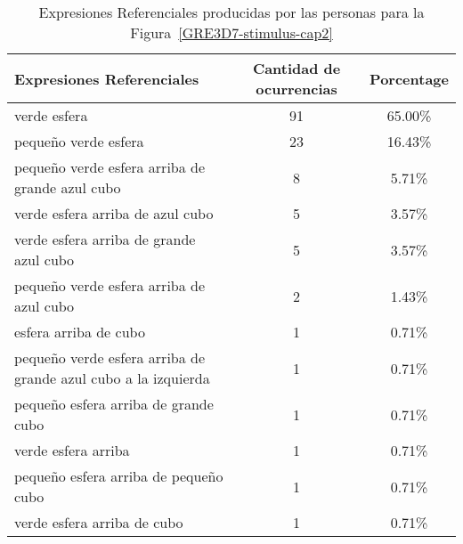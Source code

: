 \begin{table}[h!]
\begin{center}
\begin{tabular}{|l|c|c|}
\hline
Expresiones Referenciales & Cantidad de ocurrencias & Porcentage \\
\hline

verde esfera & 91 & 65.00\% \\
peque\~no verde esfera & 23 & 16.43\% \\
peque\~no verde esfera arriba de grande azul cubo & 8 & 5.71\% \\
verde esfera arriba de azul cubo & 5 & 3.57\% \\
verde esfera arriba de grande azul cubo & 5 & 3.57\% \\
peque\~no verde esfera arriba de azul cubo & 2 & 1.43\% \\
esfera arriba de cubo & 1 & 0.71\% \\
peque\~no verde esfera arriba de grande azul cubo a la izquierda & 1 & 0.71\% \\
peque\~no esfera arriba de grande cubo & 1 & 0.71\% \\
verde esfera arriba & 1 & 0.71\% \\
peque\~no esfera arriba de peque\~no cubo & 1 & 0.71\% \\
verde esfera arriba de cubo & 1 & 0.71\% \\


\hline
\end{tabular}
\caption{Expresiones Referenciales producidas por las personas para la Figura~\ref{GRE3D7-stimulus-cap2}}\label{corpus-distribution}
\end{center}
\end{table}



